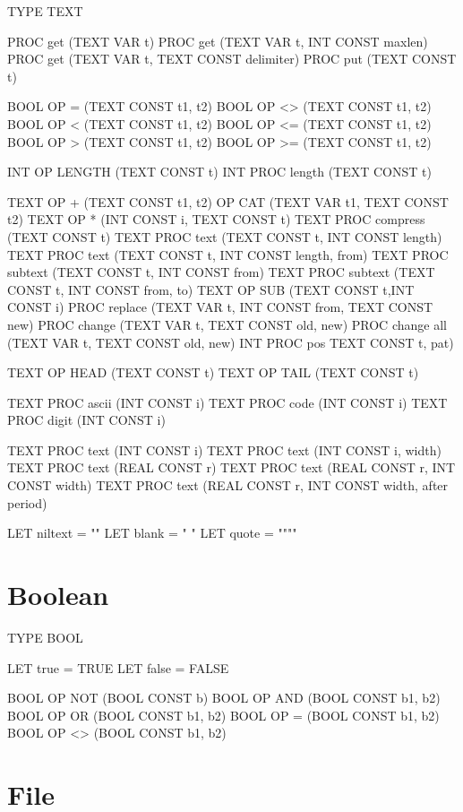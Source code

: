 \begin{elan}
TYPE TEXT

PROC get (TEXT VAR t)
PROC get (TEXT VAR t, INT CONST maxlen)
PROC get (TEXT VAR t, TEXT CONST delimiter)
PROC put (TEXT CONST t)

BOOL OP = (TEXT CONST t1, t2)
BOOL OP <> (TEXT CONST t1, t2)
BOOL OP < (TEXT CONST t1, t2)
BOOL OP <= (TEXT CONST t1, t2)
BOOL OP > (TEXT CONST t1, t2)
BOOL OP >= (TEXT CONST t1, t2)

INT OP LENGTH (TEXT CONST t)
INT PROC length (TEXT CONST t)

TEXT OP + (TEXT CONST t1, t2)
OP CAT (TEXT VAR t1, TEXT CONST t2)
TEXT OP * (INT CONST i, TEXT CONST t)
TEXT PROC compress (TEXT CONST t)
TEXT PROC text (TEXT CONST t, INT CONST length)
TEXT PROC text (TEXT CONST t, INT CONST length, from)
TEXT PROC subtext (TEXT CONST t, INT CONST from)
TEXT PROC subtext (TEXT CONST t, INT CONST from, to)
TEXT OP SUB (TEXT CONST t,INT CONST i)
PROC replace (TEXT VAR t, INT CONST from, TEXT CONST new)
PROC change (TEXT VAR t, TEXT CONST old, new)
PROC change all (TEXT VAR t, TEXT CONST old, new)
INT PROC pos TEXT CONST t, pat)

TEXT OP HEAD (TEXT CONST t)
TEXT OP TAIL (TEXT CONST t)

TEXT PROC ascii (INT CONST i)
TEXT PROC code (INT CONST i)
TEXT PROC digit (INT CONST i)

TEXT PROC text (INT CONST i)
TEXT PROC text (INT CONST i, width)
TEXT PROC text (REAL CONST r)
TEXT PROC text (REAL CONST r, INT CONST width)
TEXT PROC text (REAL CONST r, INT CONST width, after period)

LET niltext = ""
LET blank = " "
LET quote = """"
\end{elan}

\section{Boolean}

\begin{elan}
TYPE BOOL

LET true = TRUE
LET false = FALSE

BOOL OP NOT (BOOL CONST b)
BOOL OP AND (BOOL CONST b1, b2)
BOOL OP OR (BOOL CONST b1, b2)
BOOL OP = (BOOL CONST b1, b2)
BOOL OP <> (BOOL CONST b1, b2)
\end{elan}

\section{File}

